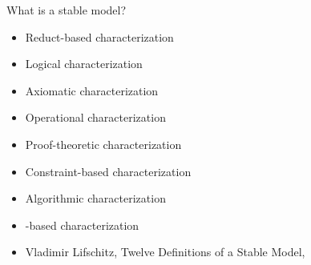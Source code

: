 \begin{frame}{What is a stable model?}
  \bigskip
  \begin{itemize}
  \item Reduct-based characterization
  \item Logical characterization
  \item Axiomatic characterization
  \item Operational characterization
  \item Proof-theoretic characterization
  \item Constraint-based characterization
  \item Algorithmic characterization
  \item \cpp-based characterization
    \bigskip
  \item <2-> Vladimir Lifschitz, Twelve Definitions of a Stable Model,
    \cite{lifschitz08a,lifschitz10a}
  \end{itemize}
\end{frame}
%
